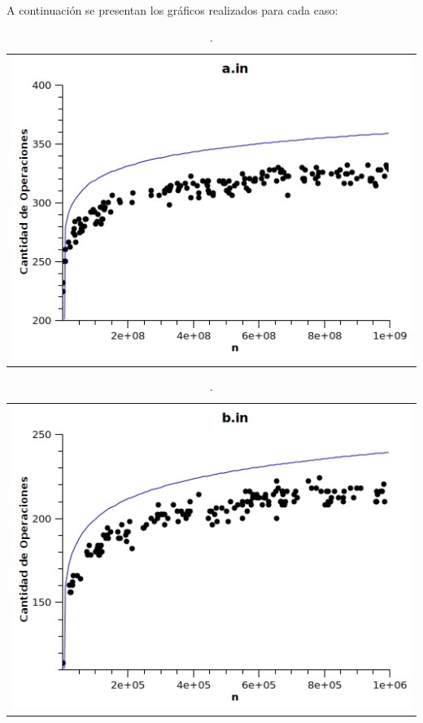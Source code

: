 \paragraph{}
A continuación se presentan los gráficos realizados para cada caso:
	\begin{table}[ht]
		\centering 
			\begin{tabular}{c}
				\includegraphics[scale = 0.8]{./../ej1/tests/a.jpg}
			\end{tabular}
			\caption{.} 
	\end{table}

	\begin{table}[ht]
		\centering 
			\begin{tabular}{c}
				\includegraphics[scale = 0.8]{./../ej1/tests/b.jpg}
			\end{tabular}
			\caption{.} 
	\end{table}

